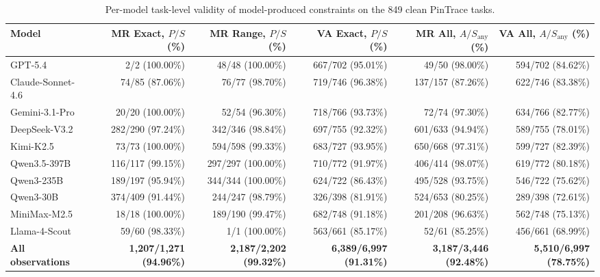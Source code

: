 \begin{table}[t]
\small
\centering
\caption{Per-model task-level validity of model-produced constraints on the 849 clean PinTrace tasks.}
\label{tab:rq2_constraint_validity}
\begin{tabular}{lrrrrr}
\toprule
Model & MR Exact, $P/S$ (\%) & MR Range, $P/S$ (\%) & VA Exact, $P/S$ (\%) & MR All, $A/S_{\mathrm{any}}$ (\%) & VA All, $A/S_{\mathrm{any}}$ (\%) \\
\midrule
GPT-5.4 & 2/2 (100.00\%) & 48/48 (100.00\%) & 667/702 (95.01\%) & 49/50 (98.00\%) & 594/702 (84.62\%) \\
Claude-Sonnet-4.6 & 74/85 (87.06\%) & 76/77 (98.70\%) & 719/746 (96.38\%) & 137/157 (87.26\%) & 622/746 (83.38\%) \\
Gemini-3.1-Pro & 20/20 (100.00\%) & 52/54 (96.30\%) & 718/766 (93.73\%) & 72/74 (97.30\%) & 634/766 (82.77\%) \\
DeepSeek-V3.2 & 282/290 (97.24\%) & 342/346 (98.84\%) & 697/755 (92.32\%) & 601/633 (94.94\%) & 589/755 (78.01\%) \\
Kimi-K2.5 & 73/73 (100.00\%) & 594/598 (99.33\%) & 683/727 (93.95\%) & 650/668 (97.31\%) & 599/727 (82.39\%) \\
Qwen3.5-397B & 116/117 (99.15\%) & 297/297 (100.00\%) & 710/772 (91.97\%) & 406/414 (98.07\%) & 619/772 (80.18\%) \\
Qwen3-235B & 189/197 (95.94\%) & 344/344 (100.00\%) & 624/722 (86.43\%) & 495/528 (93.75\%) & 546/722 (75.62\%) \\
Qwen3-30B & 374/409 (91.44\%) & 244/247 (98.79\%) & 326/398 (81.91\%) & 524/653 (80.25\%) & 289/398 (72.61\%) \\
MiniMax-M2.5 & 18/18 (100.00\%) & 189/190 (99.47\%) & 682/748 (91.18\%) & 201/208 (96.63\%) & 562/748 (75.13\%) \\
Llama-4-Scout & 59/60 (98.33\%) & 1/1 (100.00\%) & 563/661 (85.17\%) & 52/61 (85.25\%) & 456/661 (68.99\%) \\
\midrule
\textbf{All observations} & \textbf{1,207/1,271 (94.96\%)} & \textbf{2,187/2,202 (99.32\%)} & \textbf{6,389/6,997 (91.31\%)} & \textbf{3,187/3,446 (92.48\%)} & \textbf{5,510/6,997 (78.75\%)} \\
\bottomrule
\end{tabular}
\end{table}
